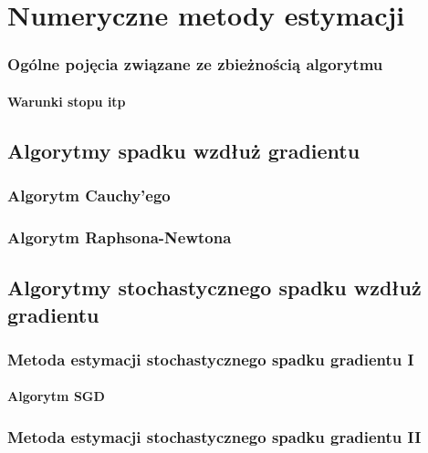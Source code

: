 \chapter{Numeryczne metody estymacji}
\subsection{Ogólne pojęcia związane ze zbieżnością algorytmu}
\subsubsection{Warunki stopu itp}
\section{Algorytmy spadku wzdłuż gradientu}
\subsection{Algorytm Cauchy'ego}
\subsection{Algorytm Raphsona-Newtona}
\section{Algorytmy stochastycznego spadku wzdłuż gradientu}\label{SGD}
\subsection{Metoda estymacji stochastycznego spadku gradientu I}
\subsubsection{Algorytm SGD}
\subsection{Metoda estymacji stochastycznego spadku gradientu II}

